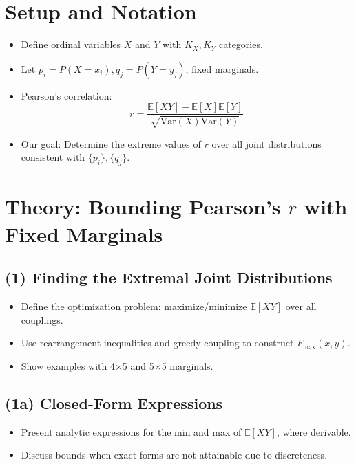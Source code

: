 \documentclass[12pt]{article}
\begin{document}
\section{Setup and Notation}

\begin{itemize}
  \item Define ordinal variables \( X \) and \( Y \) with \( K_X, K_Y \) categories.
  \item Let \( p_i = P(X = x_i), q_j = P(Y = y_j) \); fixed marginals.
  \item Pearson’s correlation:
  \[
  r = \frac{\mathbb{E}[XY] - \mathbb{E}[X]\mathbb{E}[Y]}{\sqrt{\text{Var}(X)\text{Var}(Y)}}
  \]
  \item Our goal: Determine the extreme values of \( r \) over all joint distributions consistent with \( \{p_i\}, \{q_j\} \).
\end{itemize}

\section{Theory: Bounding Pearson’s \( r \) with Fixed Marginals}

\subsection{(1) Finding the Extremal Joint Distributions}
\begin{itemize}
  \item Define the optimization problem: maximize/minimize \( \mathbb{E}[XY] \) over all couplings.
  \item Use rearrangement inequalities and greedy coupling to construct \( F_{\max}(x, y) \).
  \item Show examples with 4×5 and 5×5 marginals.
\end{itemize}

\subsection{(1a) Closed-Form Expressions}
\begin{itemize}
  \item Present analytic expressions for the min and max of \( \mathbb{E}[XY] \), where derivable.
  \item Discuss bounds when exact forms are not attainable due to discreteness.
\end{itemize}
\end{document}
